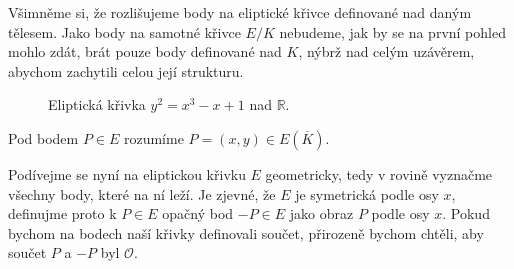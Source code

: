 \documentclass[12pt]{report}
\begin{document}
Všimněme si, že rozlišujeme body na eliptické křivce definované nad daným tělesem. Jako body na samotné křivce $E/K$ nebudeme, jak by se na první pohled mohlo zdát, brát pouze body definované nad $K$, nýbrž nad celým uzávěrem, abychom zachytili celou její strukturu.

\begin{figure}[h]
\begin{center}
\end{center}
\caption*{Eliptická křivka $y^2 = x^3-x+1$ nad $\mathbb{R}$.}
\end{figure}


\begin{znaceni}
Pod bodem $P \in E$ rozumíme $P = (x,y) \in E(\overline{K})$.
\end{znaceni}

Podívejme se nyní na eliptickou křivku $E$ geometricky, tedy v rovině vyznačme všechny body, které na ní leží. Je zjevné, že $E$ je symetrická podle osy $x$, definujme proto k $P \in E$ opačný bod $-P \in E$ jako obraz $P$ podle osy $x$. Pokud bychom na bodech naší křivky definovali součet, přirozeně bychom chtěli, aby součet $P$ a $-P$ byl $\mathcal{O}$.
\end{document}
